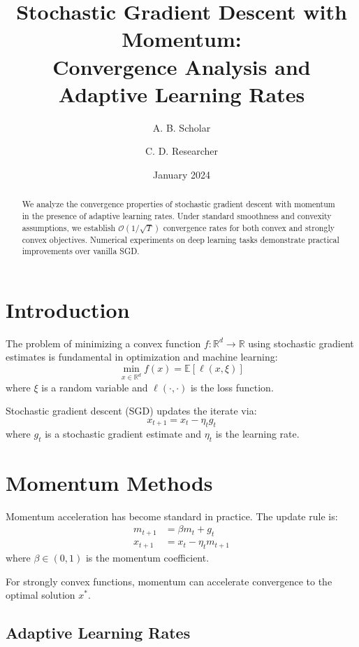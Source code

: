 \documentclass[11pt]{article}
\title{Stochastic Gradient Descent with Momentum:\\
Convergence Analysis and Adaptive Learning Rates}
\author{A. B. Scholar \and C. D. Researcher}
\date{January 2024}
\begin{document}
\maketitle

\begin{abstract}
We analyze the convergence properties of stochastic gradient descent with momentum
in the presence of adaptive learning rates. Under standard smoothness and convexity
assumptions, we establish $\mathcal{O}(1/\sqrt{T})$ convergence rates for both
convex and strongly convex objectives. Numerical experiments on deep learning tasks
demonstrate practical improvements over vanilla SGD.
\end{abstract}

\section{Introduction}

The problem of minimizing a convex function $f: \mathbb{R}^d \to \mathbb{R}$ using
stochastic gradient estimates is fundamental in optimization and machine learning:
\begin{equation}
\min_{x \in \mathbb{R}^d} f(x) = \mathbb{E}[\ell(x, \xi)]
\end{equation}
where $\xi$ is a random variable and $\ell(\cdot, \cdot)$ is the loss function.

Stochastic gradient descent (SGD) updates the iterate via:
\begin{equation}
x_{t+1} = x_t - \eta_t g_t
\end{equation}
where $g_t$ is a stochastic gradient estimate and $\eta_t$ is the learning rate.

\section{Momentum Methods}

Momentum acceleration has become standard in practice. The update rule is:
\begin{align}
m_{t+1} &= \beta m_t + g_t \label{eq:momentum} \\
x_{t+1} &= x_t - \eta_t m_{t+1}
\end{align}
where $\beta \in (0,1)$ is the momentum coefficient.

For strongly convex functions, momentum can accelerate convergence to the optimal solution $x^*$.

\subsection{Adaptive Learning Rates}
\end{document}
